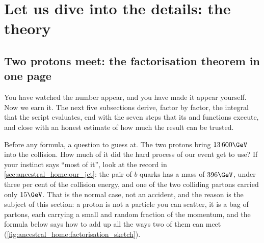 \section{Let us dive into the details: the theory}
\label{sec:ancestral_home:theory}

\subsection{Two protons meet: the factorisation theorem in one page}
\label{sec:ancestral_home:two_protons_meet}

You have watched the number appear, and you have made it appear yourself.
Now we earn it. The next five subsections derive, factor by factor, the
integral that the script evaluates, end with the seven steps that its
 and  functions execute, and close with
an honest estimate of how much the result can be trusted.

Before any formula, a question to guess at. The two protons bring
$13\,600\GeV$ into the collision. How much of it did the hard process of our
event get to use? If your instinct says ``most of it'', look at the record in
\cref{sec:ancestral_home:our_jet}: the pair of $b$ quarks has a mass of
$396\GeV$, under three per cent of the collision energy, and one of the two
colliding partons carried only $15\GeV$. That is the normal case, not an
accident, and the reason is the subject of this section: a proton is not a
particle you can scatter, it is a bag of partons, each carrying a small and
random fraction of the momentum, and the formula below says how to add up
all the ways two of them can meet (\cref{fig:ancestral_home:factorisation_sketch}).

